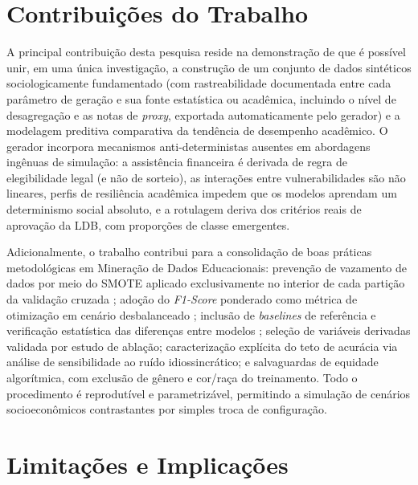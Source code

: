 \section{Contribuições do Trabalho}

A principal contribuição desta pesquisa reside na demonstração de que é possível unir, em uma única investigação, a construção de um conjunto de dados sintéticos sociologicamente fundamentado (com rastreabilidade documentada entre cada parâmetro de geração e sua fonte estatística ou acadêmica, incluindo o nível de desagregação e as notas de \textit{proxy}, exportada automaticamente pelo gerador) e a modelagem preditiva comparativa da tendência de desempenho acadêmico. O gerador incorpora mecanismos anti-deterministas ausentes em abordagens ingênuas de simulação: a assistência financeira é derivada de regra de elegibilidade legal (e não de sorteio), as interações entre vulnerabilidades são não lineares, perfis de resiliência acadêmica impedem que os modelos aprendam um determinismo social absoluto, e a rotulagem deriva dos critérios reais de aprovação da LDB, com proporções de classe emergentes.

Adicionalmente, o trabalho contribui para a consolidação de boas práticas metodológicas em Mineração de Dados Educacionais: prevenção de vazamento de dados por meio do SMOTE aplicado exclusivamente no interior de cada partição da validação cruzada \cite{madugula2026}; adoção do \textit{F1-Score} ponderado como métrica de otimização em cenário desbalanceado \cite{he2009}; inclusão de \textit{baselines} de referência e verificação estatística das diferenças entre modelos \cite{demsar2006}; seleção de variáveis derivadas validada por estudo de ablação; caracterização explícita do teto de acurácia via análise de sensibilidade ao ruído idiossincrático; e salvaguardas de equidade algorítmica, com exclusão de gênero e cor/raça do treinamento. Todo o procedimento é reprodutível e parametrizável, permitindo a simulação de cenários socioeconômicos contrastantes por simples troca de configuração.

\section{Limitações e Implicações}

